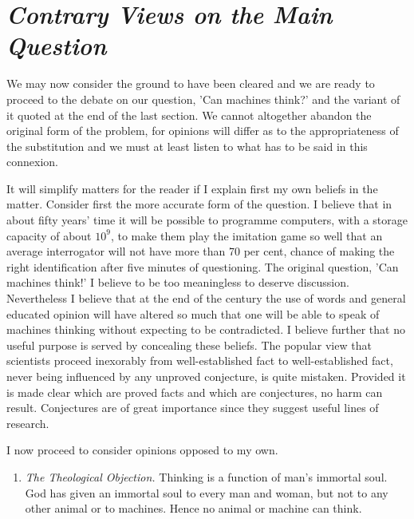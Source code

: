     \section{\textit{Contrary Views on the Main Question}}
    
    We may now consider the ground to have been cleared and we are ready to proceed to the debate on our question, 'Can machines think?' and the variant of it quoted at the end of the last section. We cannot altogether abandon the original form of the problem, for opinions will differ as to the appropriateness of the substitution and we must at least listen to what has to be said in this connexion.

    It will simplify matters for the reader if I explain first my own beliefs in the matter. Consider first the more accurate form of the question. I believe that in about fifty years' time it will be possible to programme computers, with a storage capacity of about $10^9$, to make them play the imitation game so well that an average interrogator will not have more than 70 per cent, chance of making the right identification after five minutes of questioning. The original question, 'Can machines think!' I believe to be too meaningless to deserve discussion. Nevertheless I believe that at the end of the century the use of words and general educated opinion will have altered so much that one will be able to speak of machines thinking without expecting to be contradicted. I believe further that no useful purpose is served by concealing these beliefs. The popular view that scientists proceed inexorably from well-established fact to well-established fact, never being influenced by any unproved conjecture, is quite mistaken. Provided it is made clear which are proved facts and which are conjectures, no harm can result. Conjectures are of great importance since they suggest useful lines of research.

    I now proceed to consider opinions opposed to my own.

    \begin{enumerate}[label=(\arabic*)]
        \setcounter{enumi}{0}
        \item{\textit{The Theological Objection.} Thinking is a function of man's immortal soul. God has given an immortal soul to every man and woman, but not to any other animal or to machines. Hence no animal or machine can think.}
    \end{enumerate}


